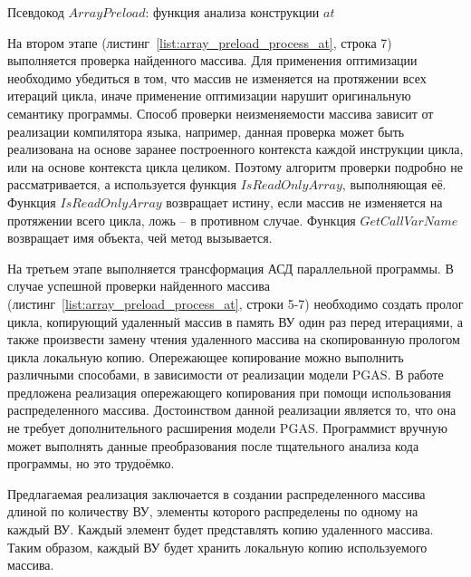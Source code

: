 \begin{ListingEnv}[!h]
	\small {}
    \caption{Псевдокод $ArrayPreload$: функция анализа конструкции $at$}
    \label{list:array_preload_process_at}
\end{ListingEnv} 

На втором этапе (листинг~\ref{list:array_preload_process_at}, строка 7) 
выполняется проверка найденного массива. Для применения оптимизации необходимо 
убедиться в том, что массив не изменяется на протяжении всех итераций цикла, 
иначе применение оптимизации нарушит оригинальную семантику программы. Способ 
проверки неизменяемости массива зависит от реализации компилятора языка, 
например, данная проверка может быть реализована на основе заранее построенного 
контекста каждой инструкции цикла, или на основе контекста цикла целиком. 
Поэтому алгоритм проверки подробно не рассматривается, а используется функция 
$IsReadOnlyArray$, выполняющая её. Функция $IsReadOnlyArray$ возвращает истину, 
если массив не изменяется на протяжении всего цикла, ложь -- в противном случае. 
Функция $GetCallVarName$ возвращает имя объекта, чей метод вызывается.

На третьем этапе выполняется трансформация АСД параллельной программы. В случае 
успешной проверки найденного массива 
(листинг~\ref{list:array_preload_process_at}, строки 5-7) необходимо создать 
пролог цикла, копирующий удаленный массив в память ВУ один раз перед итерациями, 
а также произвести замену чтения удаленного массива на скопированную прологом 
цикла локальную копию. Опережающее копирование можно выполнить различными 
способами, в зависимости от реализации модели PGAS. В работе предложена 
реализация опережающего копирования при помощи использования распределенного 
массива. Достоинством данной реализации является то, что она не требует 
дополнительного расширения модели PGAS. Программист вручную может выполнять 
данные преобразования после тщательного анализа кода программы, но это 
трудоёмко.

Предлагаемая реализация заключается в создании распределенного массива длиной по 
количеству ВУ, элементы которого распределены по одному на каждый ВУ. Каждый 
элемент будет представлять копию удаленного массива. Таким образом, каждый ВУ 
будет хранить локальную копию используемого массива.

